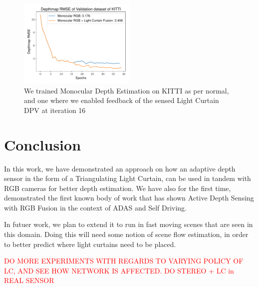 \begin{figure}[h]
   \centering
   \begin{minipage}{0.5\textwidth}
       \centering
       \includegraphics[width=0.5\textwidth]{figures/Figure_10.pdf}
   \end{minipage}\hfill
   \centering
   \caption{We trained Monocular Depth Estimation on KITTI as per normal, and one where we enabled feedback of the sensed Light Curtain DPV at iteration 16}
   \label{fig:lfusion} 
\end{figure}

\section{Conclusion}

In this work, we have demonstrated an approach on how an adaptive depth sensor in the form of a Triangulating Light Curtain, can be used in tandem with RGB cameras for better depth estimation. We have also for the first time, demonstrated the first known body of work that has shown Active Depth Sensing with RGB Fusion in the context of ADAS and Self Driving.

In futuer work, we plan to extend it to run in fast moving scenes that are seen in this domain. Doing this will need 
some notion of scene flow estimation, in order to better predict where light curtains need to be placed.

\textcolor{red}{DO MORE EXPERIMENTS WITH REGARDS TO VARYING POLICY OF LC, AND SEE HOW NETWORK IS AFFECTED. DO STEREO + LC in REAL SENSOR}


